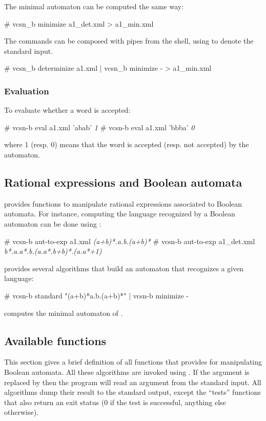 The minimal automaton can be computed the same way:
\begin{shell}
# vcsn_b minimize a1_det.xml > a1_min.xml
\end{shell}
The commands can be composed with pipes from the shell, using \samp{-}
to denote the standard input.
\begin{shell}
# vcsn_b determinize a1.xml | vcsn_b minimize - > a1_min.xml
\end{shell}


\subsubsection{Evaluation}

To evaluate whether a word is accepted:
\begin{shell}
# vcsn-b eval a1.xml 'abab'
\textit{1}
# vcsn-b eval a1.xml 'bbba'
\textit{0}
\end{shell}
where 1 (resp. 0) means that the word is accepted (resp. not accepted)
by the automaton.

\subsection{Rational expressions and Boolean automata}

\Vauc provides functions to manipulate rational expressions associated
to Boolean automata. For instance, computing the language recognized
by a Boolean automaton can be done using :
\begin{shell}
# vcsn-b aut-to-exp a1.xml
\textit{(a+b)*.a.b.(a+b)*}
# vcsn-b aut-to-exp a1_det.xml
\textit{b*.a.a*.b.(a.a*.b+b)*.(a.a*+1)}
\end{shell}

\Vauc provides several algorithms that build an automaton that
recognizes a given language:
\begin{shell}
# vcsn-b standard "(a+b)*a.b.(a+b)*" | vcsn-b minimize -
\end{shell}
computes the minimal automaton of .

\subsection{Available functions}
This section gives a brief definition of all functions that \Vauc
provides for manipulating Boolean automata.  All these algorithms are
invoked using . If
the argument is replaced by \samp{-} then the program will read an
argument from the standard input.  All algorithms dump their result to
the standard output, except the ``tests'' functions that also return
an exit status (0 if the test is successful, anything else otherwise).


